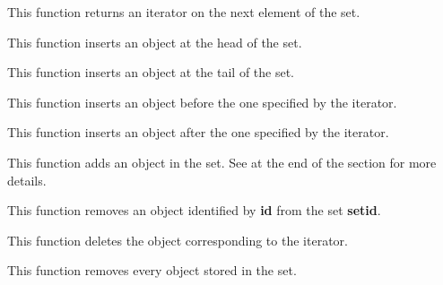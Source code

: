 This function returns an iterator on the next element of the set.


This function inserts an object at the head of the set.


This function inserts an object at the tail of the set.


This function inserts an object before the one specified by the iterator.


This function inserts an object after the one specified by the iterator.


This function adds an object in the set. See at the end of the section
for more details.


This function removes an object identified by \textbf{id} from the
set \textbf{setid}.


This function deletes the object corresponding to the iterator.


This function removes every object stored in the set.


